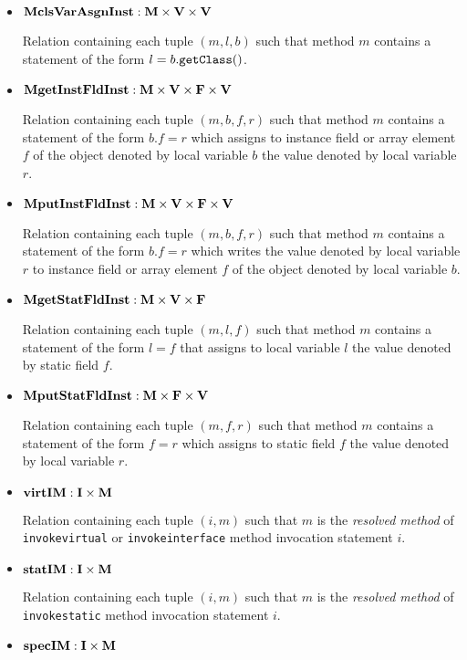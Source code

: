 \documentclass{article}
\providecommand\Mdom{{\bf M}}
\providecommand\Idom{{\bf I}}
\providecommand\Vdom{{\bf V}}
\providecommand\Fdom{{\bf F}}
\providecommand\virtIM{{\bf virtIM}}
\providecommand\statIM{{\bf statIM}}
\providecommand\specIM{{\bf specIM}}
\providecommand\MclsVarAsgnInst{{\bf MclsVarAsgnInst}}
\providecommand\MgetInstFldInst{{\bf MgetInstFldInst}}
\providecommand\MputInstFldInst{{\bf MputInstFldInst}}
\providecommand\MgetStatFldInst{{\bf MgetStatFldInst}}
\providecommand\MputStatFldInst{{\bf MputStatFldInst}}
\begin{document}
\begin{itemize}
\item
$\MclsVarAsgnInst : \Mdom \times \Vdom \times \Vdom$

Relation containing each tuple $(m,l,b)$ such that method $m$
contains a statement of the form $l = b.{\tt getClass()}$.

\item
$\MgetInstFldInst : \Mdom \times \Vdom \times \Fdom \times \Vdom$

Relation containing each tuple $(m,b,f,r)$ such that method $m$
contains a statement of the form $b.f = r$ which assigns to
instance field or array element $f$ of the object denoted by local
variable $b$ the value denoted by local variable $r$.

\item
$\MputInstFldInst : \Mdom \times \Vdom \times \Fdom \times \Vdom$

Relation containing each tuple $(m,b,f,r)$ such that method $m$
contains a statement of the form $b.f = r$ which writes the value
denoted by local variable $r$ to instance field or array element
$f$ of the object denoted by local variable $b$.

\item
$\MgetStatFldInst : \Mdom \times \Vdom \times \Fdom$

Relation containing each tuple $(m,l,f)$ such that method $m$ contains
a statement of the form $l = f$ that assigns to local variable $l$ the
value denoted by static field $f$.

\item
$\MputStatFldInst : \Mdom \times \Fdom \times \Vdom$

Relation containing each tuple $(m,f,r)$ such that method $m$ contains
a statement of the form $f = r$ which assigns to static field $f$ the
value denoted by local variable $r$.

\item
$\virtIM : \Idom \times \Mdom$

Relation containing each tuple $(i,m)$ such that $m$ is the
{\it resolved method} of {\tt invokevirtual} or {\tt invokeinterface} method
invocation statement $i$.

\item
$\statIM : \Idom \times \Mdom$

Relation containing each tuple $(i,m)$ such that $m$ is the
{\it resolved method} of {\tt invokestatic} method invocation statement $i$.

\item
$\specIM : \Idom \times \Mdom$


\end{itemize}
\end{document}
